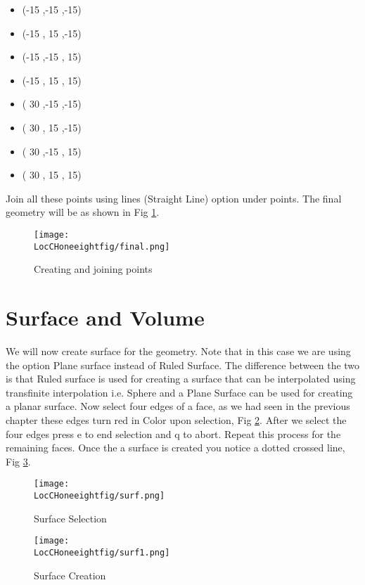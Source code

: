 \begin{itemize}
  \item (-15 ,-15 ,-15)
  \item (-15 , 15 ,-15)
  \item (-15 ,-15 , 15)
  \item (-15 , 15 , 15)
  \item ( 30 ,-15 ,-15)
  \item ( 30 , 15 ,-15)
  \item ( 30 ,-15 , 15)
  \item ( 30 , 15 , 15)
\end{itemize}

\flushleft Join all these points using lines (Straight Line) option under points. The final geometry will be as shown in Fig \ref{final-geom}.

\begin{figure}[h]  
\centering
\texttt{[image: \\LocCHoneeightfig/final.png]}
\caption{Creating and joining points}
\label{final-geom}
\end{figure}

\section{Surface and Volume}

We will now create surface for the geometry. Note that in this case we are using the option Plane surface instead of Ruled Surface. The difference between the two is that Ruled surface is used for creating a surface that can be interpolated using transfinite interpolation i.e. Sphere and a Plane Surface can be used for creating a planar surface. Now select four edges of a face, as we had seen in the previous chapter these edges turn red in Color upon selection, Fig \ref{surf}. After we select the four edges press e to end selection and q to abort. Repeat this process for the remaining faces. Once the a surface is created you notice a dotted crossed line, Fig \ref{surf1}.

\begin{figure}[h]  
\centering
\texttt{[image: \\LocCHoneeightfig/surf.png]}
\caption{Surface Selection}
\label{surf}
\end{figure}

\begin{figure}[h]  
\centering
\texttt{[image: \\LocCHoneeightfig/surf1.png]}
\caption{Surface Creation}
\label{surf1}
\end{figure}

